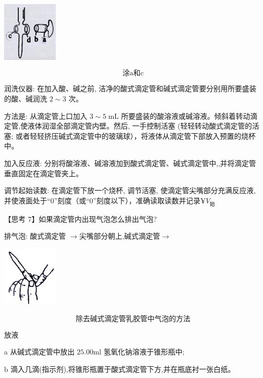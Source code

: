 \documentclass[10pt,cn]{elegantbook}
\begin{document}
	\begin{center}
		\includegraphics[max width=0.2\textwidth]{image/c3-1.jpg}
	\end{center}
	
		\[\mbox{涂a和c}\]
	
	
	润洗仪器: 在加入酸、碱之前, 洁净的酸式滴定管和碱式滴定管要分别用所要盛装的酸、碱润洗 \(2 \sim 3\) 次。
	
	方法是: 从滴定管上口加入 \(3 \sim 5\mathrm{\;{mL}}\) 所要盛装的酸溶液或碱溶液。倾斜着转动滴定管,使液体润湿全部滴定管内壁。然后, 一手控制活塞 (轻轻转动酸式滴定管的活塞; 或者轻轻挤压碱式滴定管中的玻璃球），将液体从滴定管下部放入预置的烧杯中。
	
	加入反应液: 分别将酸溶液、碱溶液加到酸式滴定管、碱式滴定管中,,并将滴定管垂直固定在滴定管夹上。
	
	
	调节起始读数: 在滴定管下放一个烧杯, 调节活塞, 使滴定管尖嘴部分充满反应液, 并使液面处于“0”刻度（或“0”刻度以下），准确读取读数并记录$¥V_{\mbox{始}}$
	
	【思考 7】如果滴定管内出现气泡怎么排出气泡? 
	
	排气泡: 酸式滴定管 \(\rightarrow\)尖嘴部分朝上,碱式滴定管\(\rightarrow\)
	
	\begin{center}
		\includegraphics[max width=0.2\textwidth]{image/c4-1.jpg}
	\end{center}
		\[\mbox{除去碱式滴定管乳胶管中气泡的方法}\]
	
	
	 放液
	
	a 从碱式滴定管中放出 \({25.00}\mathrm{{ml}}\) 氢氧化钠溶液于锥形瓶中;
	
	
	
	\(\mathrm{b}\) 滴入几滴(指示剂),将锥形瓶置于酸式滴定管下方,并在瓶底衬一张白纸。
	
\end{document}
